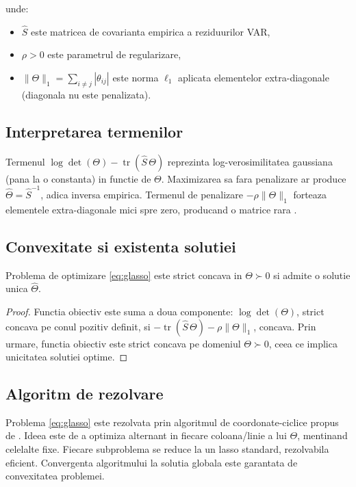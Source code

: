 unde:
\begin{itemize}
    \item $\hat{S}$ este matricea de covarianta empirica a reziduurilor VAR,
    \item $\rho > 0$ este parametrul de regularizare,
    \item $\|\Theta\|_1 = \sum_{i \neq j} |\theta_{ij}|$ este norma $\ell_1$
    aplicata elementelor extra-diagonale (diagonala nu este penalizata).
\end{itemize}

\subsection{Interpretarea termenilor}

Termenul $\log\det(\Theta) - \operatorname{tr}(\hat{S}\,\Theta)$ reprezinta
log-verosimilitatea gaussiana (pana la o constanta) in functie de $\Theta$.
Maximizarea sa fara penalizare ar produce $\hat{\Theta} = \hat{S}^{-1}$,
adica inversa empirica. Termenul de penalizare $-\rho\|\Theta\|_1$ forteaza
elementele extra-diagonale mici spre zero, producand o matrice rara
\citep{friedman2008}.

\subsection{Convexitate si existenta solutiei}

\begin{proposition}
Problema de optimizare \eqref{eq:glasso} este strict concava in $\Theta \succ 0$
si admite o solutie unica $\hat{\Theta}$.
\end{proposition}

\begin{proof}
Functia obiectiv este suma a doua componente: $\log\det(\Theta)$, strict concava
pe conul pozitiv definit, si $-\operatorname{tr}(\hat{S}\,\Theta) - \rho\|\Theta\|_1$,
concava. Prin urmare, functia obiectiv este strict concava pe domeniul
$\Theta \succ 0$, ceea ce implica unicitatea solutiei optime.
\end{proof}

\subsection{Algoritm de rezolvare}

Problema \eqref{eq:glasso} este rezolvata prin algoritmul de coordonate-ciclice
propus de \citep{friedman2008}. Ideea este de a optimiza alternant in fiecare
coloana/linie a lui $\Theta$, mentinand celelalte fixe. Fiecare subproblema
se reduce la un lasso standard, rezolvabila eficient. Convergenta algoritmului
la solutia globala este garantata de convexitatea problemei.

